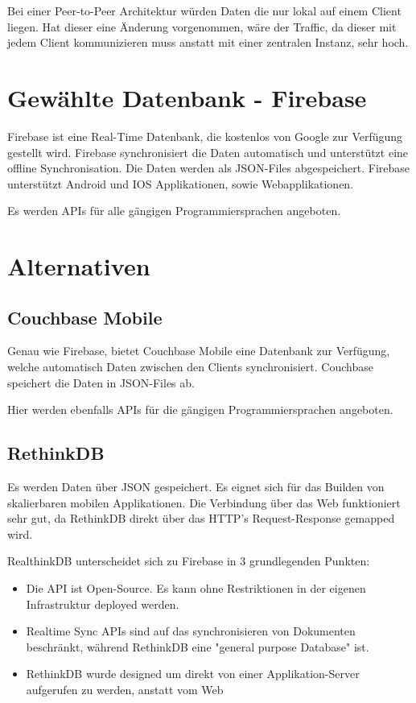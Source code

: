 Bei einer Peer-to-Peer Architektur würden Daten die nur lokal auf einem Client liegen. Hat dieser eine Änderung vorgenommen, wäre der Traffic, da dieser mit jedem Client kommunizieren muss anstatt mit einer zentralen Instanz, sehr hoch.
\section{Gewählte Datenbank - Firebase}
Firebase ist eine Real-Time Datenbank, die kostenlos von Google zur Verfügung gestellt wird. Firebase synchronisiert die Daten automatisch und unterstützt eine offline Synchronisation. Die Daten werden als JSON-Files abgespeichert. Firebase unterstützt Android und IOS Applikationen, sowie Webapplikationen.

Es werden APIs für alle gängigen Programmiersprachen angeboten.


\section{Alternativen}
\subsection{Couchbase Mobile}
Genau wie Firebase, bietet Couchbase Mobile eine Datenbank zur Verfügung, welche automatisch Daten zwischen den Clients synchronisiert. Couchbase speichert die Daten in JSON-Files ab. 

Hier werden ebenfalls APIs für die gängigen Programmiersprachen angeboten.

\subsection{RethinkDB}
Es werden Daten über JSON gespeichert. Es eignet sich für das Builden von skalierbaren mobilen Applikationen. Die Verbindung über das Web funktioniert sehr gut, da RethinkDB direkt über das HTTP's Request-Response gemapped wird.

RealthinkDB unterscheidet sich zu Firebase in 3 grundlegenden Punkten:
\begin{itemize}
	\item Die API ist Open-Source. Es kann ohne Restriktionen in der eigenen Infrastruktur deployed werden.
	\item Realtime Sync APIs sind auf das synchronisieren von Dokumenten beschränkt, während RethinkDB eine "general purpose Database" ist.
	\item RethinkDB wurde designed um direkt von einer Applikation-Server aufgerufen zu werden, anstatt vom Web
\end{itemize}


